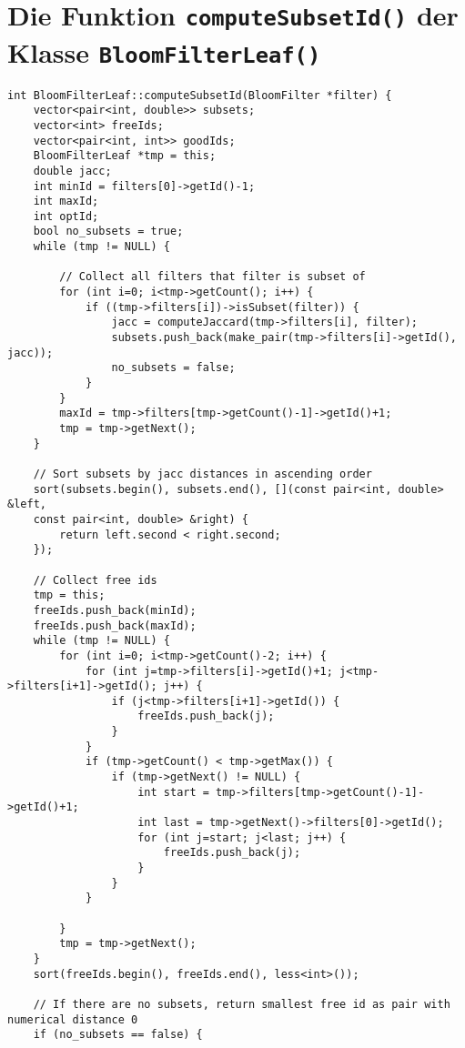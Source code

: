 \section{Die Funktion \texttt{computeSubsetId()} der Klasse \texttt{BloomFilterLeaf()}}\label{sec:computeSubsetId()}
\small{
\begin{verbatim}
int BloomFilterLeaf::computeSubsetId(BloomFilter *filter) {
    vector<pair<int, double>> subsets;
    vector<int> freeIds;
    vector<pair<int, int>> goodIds;
    BloomFilterLeaf *tmp = this;
    double jacc;
    int minId = filters[0]->getId()-1;
    int maxId;
    int optId;
    bool no_subsets = true;
    while (tmp != NULL) {
        
        // Collect all filters that filter is subset of
        for (int i=0; i<tmp->getCount(); i++) {
            if ((tmp->filters[i])->isSubset(filter)) {
                jacc = computeJaccard(tmp->filters[i], filter);
                subsets.push_back(make_pair(tmp->filters[i]->getId(), jacc));
                no_subsets = false;
            }
        }
        maxId = tmp->filters[tmp->getCount()-1]->getId()+1;
        tmp = tmp->getNext();
    }
    
    // Sort subsets by jacc distances in ascending order
    sort(subsets.begin(), subsets.end(), [](const pair<int, double> &left, 
    const pair<int, double> &right) {
        return left.second < right.second;
    });
    
    // Collect free ids
    tmp = this;
    freeIds.push_back(minId);
    freeIds.push_back(maxId);
    while (tmp != NULL) {
        for (int i=0; i<tmp->getCount()-2; i++) {
            for (int j=tmp->filters[i]->getId()+1; j<tmp->filters[i+1]->getId(); j++) {
                if (j<tmp->filters[i+1]->getId()) {
                    freeIds.push_back(j);
                }
            }
            if (tmp->getCount() < tmp->getMax()) {
                if (tmp->getNext() != NULL) {
                    int start = tmp->filters[tmp->getCount()-1]->getId()+1;
                    int last = tmp->getNext()->filters[0]->getId();
                    for (int j=start; j<last; j++) {
                        freeIds.push_back(j);
                    }
                }
            }
            
        }
        tmp = tmp->getNext();
    }
    sort(freeIds.begin(), freeIds.end(), less<int>());
    
    // If there are no subsets, return smallest free id as pair with numerical distance 0
    if (no_subsets == false) {
        

\end{verbatim}}
